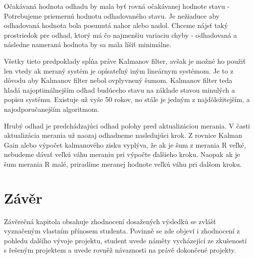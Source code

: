 Očakávaná hodnota odhadu by mala byť rovná očakávanej hodnote stavu - Potrebujeme priemernú hodnotu odhadovaného stavu. Je nežiaduce aby odhadovaná hodnota bola posunutá nahor alebo nadol. 
Chceme nájsť taký prostriedok pre odhad, ktorý má čo najmenšiu variaciu chyby - odhadovaná a následne nameraná hodnota by sa mala líšiť minimálne. 



Všetky tieto predpoklady spĺňa práve Kalmanov filter, avšak je možné ho použiť len vtedy ak  meraný systém je opísateľný iným lineárnym systémom. Je to z dôvodu aby Kalmanov filter nebol ovplyvnený šumom. Kalmanov filter teda hladá najoptimálnejším odhad budúceho stavu na základe stavou minulých a popisu systému.  Existuje už vyše 50 rokov, no stále je jedným z najdôležitejším, a najodporučanejším algoritmom.






Hrubý odhad je predchádzajúci odhad polohy pred aktualizáciou merania. V časti aktualizácia merania už naozaj odhadneme nasledujúci krok. Z rovnice Kalman Gain alebo výpočet kalmanového zisku vyplýva, že ak je šum z merania R veľké, nebudeme dávať veľkú váhu meraniu pri výpočte ďalšieho kroku. Naopak ak je šum merania R malé, priradíme meranej hodnote veľkú váhu pri dalšom kroku.  


\chapter{Závěr}
Závěrečná kapitola obsahuje zhodnocení dosažených výsledků se zvlášť vyznačeným vlastním přínosem studenta. Povinně se zde objeví i zhodnocení z pohledu dalšího vývoje projektu, student uvede náměty vycházející ze zkušeností s řešeným projektem a uvede rovněž návaznosti na právě dokončené projekty.

